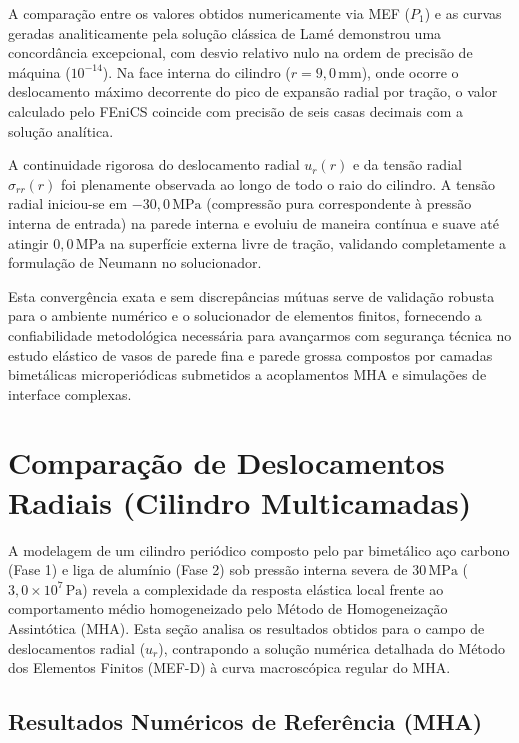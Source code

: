 
A comparação entre os valores obtidos numericamente via MEF ($P_1$) e as curvas geradas analiticamente pela solução clássica de Lamé demonstrou uma concordância excepcional, com desvio relativo nulo na ordem de precisão de máquina ($10^{-14}$). Na face interna do cilindro ($r = 9,0 \, \text{mm}$), onde ocorre o deslocamento máximo decorrente do pico de expansão radial por tração, o valor calculado pelo FEniCS coincide com precisão de seis casas decimais com a solução analítica.

A continuidade rigorosa do deslocamento radial $u_r (r)$ e da tensão radial $\sigma_{rr}(r)$ foi plenamente observada ao longo de todo o raio do cilindro. A tensão radial iniciou-se em $-30,0 \, \text{MPa}$ (compressão pura correspondente à pressão interna de entrada) na parede interna e evoluiu de maneira contínua e suave até atingir $0,0 \, \text{MPa}$ na superfície externa livre de tração, validando completamente a formulação de Neumann no solucionador.

Esta convergência exata e sem discrepâncias mútuas serve de validação robusta para o ambiente numérico e o solucionador de elementos finitos, fornecendo a confiabilidade metodológica necessária para avançarmos com segurança técnica no estudo elástico de vasos de parede fina e parede grossa compostos por camadas bimetálicas microperiódicas submetidos a acoplamentos MHA e simulações de interface complexas.

\section{Comparação de Deslocamentos Radiais (Cilindro Multicamadas)}\label{sec:comparacao_deslocamentos}

A modelagem de um cilindro periódico composto pelo par bimetálico aço carbono (Fase 1) e liga de alumínio (Fase 2) sob pressão interna severa de $30 \, \text{MPa}$ ($3,0 \times 10^7 \, \text{Pa}$) revela a complexidade da resposta elástica local frente ao comportamento médio homogeneizado pelo Método de Homogeneização Assintótica (MHA). Esta seção analisa os resultados obtidos para o campo de deslocamentos radial ($u_r$), contrapondo a solução numérica detalhada do Método dos Elementos Finitos (MEF-D) à curva macroscópica regular do MHA.

\subsection{Resultados Numéricos de Referência (MHA)}

